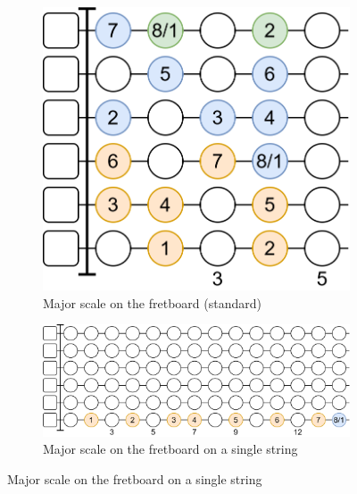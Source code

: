 \newpage

\begin{figure}[h]
	\begin{subfigure}[b]{0.45\textwidth}
		\centering
		\includegraphics[height=0.18\textheight]{../../Images/guitar_major_scale_standard.png}
		\caption{Major scale on the fretboard (standard)}
		\label{fig:guitar_major_scale_fretboard_standard}
	\end{subfigure}
	\hfill
		
	\vspace{0.5cm}
	\begin{subfigure}[b]{\textwidth}
		\centering
		\includegraphics[height=0.18\textheight]{../../Images/guitar_major_scale_single_string.png}
		\caption{Major scale on the fretboard on a single string}
		\label{fig:guitar_major_scale_fretboard_single_string}
	\end{subfigure}
	

\end{figure}
